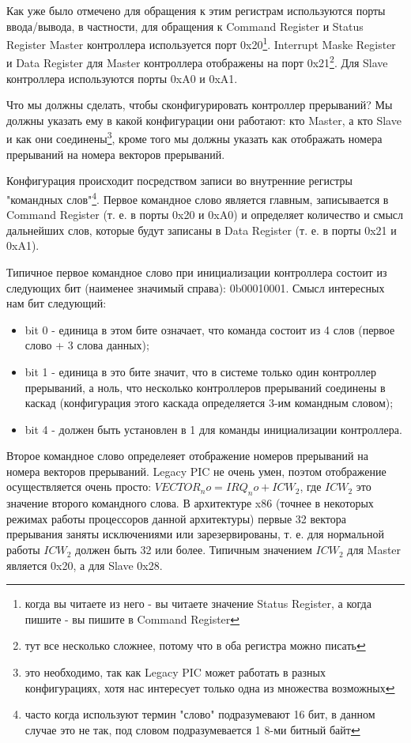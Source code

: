 Как уже было отмечено для обращения к этим регистрам используются порты
ввода/вывода, в частности, для обращения к Command Register и Status Register
Master контроллера используется порт 0x20\footnote{когда вы читаете из него - вы
читаете значение Status Register, а когда пишите - вы пишите в Command
Register}. Interrupt Maske Register и Data Register для Master контроллера
отображены на порт 0x21\footnote{тут все несколько сложнее, потому что в оба
регистра можно писать}. Для Slave контроллера используются порты 0xA0 и 0xA1.

Что мы должны сделать, чтобы сконфигурировать контроллер прерываний? Мы должны
указать ему в какой конфигурации они работают: кто Master, а кто Slave и как они
соединены\footnote{это необходимо, так как Legacy PIC может работать в разных
конфигурациях, хотя нас интересует только одна из множества возможных}, кроме
того мы должны указать как отображать номера прерываний на номера векторов
прерываний.

Конфигурация происходит посредством записи во внутренние регистры "командных
слов"\footnote{часто когда используют термин "слово" подразумевают 16 бит, в
данном случае это не так, под словом подразумевается 1 8-ми битный байт}. Первое
командное слово является главным, записывается в Command Register (т. е. в порты
0x20 и 0xA0) и определяет количество и смысл дальнейших слов, которые будут
записаны в Data Register (т. е. в порты 0x21 и 0xA1).

Типичное первое командное слово при инициализации контроллера состоит из
следующих бит (наименее значимый справа): 0b00010001. Смысл интересных нам бит
следующий:

\begin{itemize}
  \item bit 0 - единица в этом бите означает, что команда состоит из 4 слов
        (первое слово + 3 слова данных);
  \item bit 1 - единица в это бите значит, что в системе только один контроллер
        прерываний, а ноль, что несколько контроллеров прерываний соединены в
        каскад (конфигурация этого каскада определяется 3-им командным словом);
  \item bit 4 - должен быть установлен в 1 для команды инициализации
        контроллера.
\end{itemize}

Второе командное слово определеяет отображение номеров прерываний на номера
векторов прерываний. Legacy PIC не очень умен, поэтом отображение осуществляется
очень просто: $VECTOR_no = IRQ_no + ICW_2$, где $ICW_2$ это значение второго
командного слова. В архитектуре x86 (точнее в некоторых режимах работы
процессоров данной архитектуры) первые 32 вектора прерывания заняты исключениями
или зарезервированы, т. е. для нормальной работы $ICW_2$ должен быть 32 или
более. Типичным значением $ICW_2$ для Master является 0x20, а для Slave 0x28.

